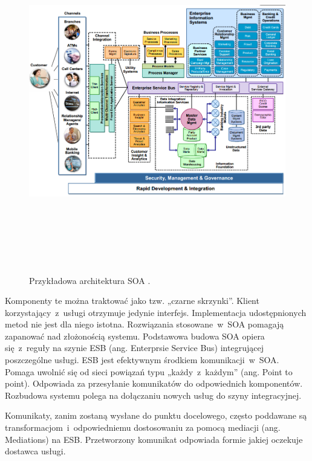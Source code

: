\begin{figure}[h!tbp]
\begin{centering}
\includegraphics[width=16cm, height=15cm]{img/soa_arch.png}
\caption[Przykładowa architektura SOA.]{Przykładowa architektura SOA \cite{EXEntArchSOA}.}\label{PRZArchSOA}
\end{centering}
\end{figure}

Komponenty te można traktować jako tzw. „czarne skrzynki”. Klient korzystający~z~usługi otrzymuje jedynie interfejs. Implementacja udostępnionych metod nie jest dla niego istotna.
Rozwiązania stosowane~w~SOA pomagają zapanować nad złożonością systemu. Podstawowa budowa SOA opiera się~z~reguły na szynie ESB (ang. Enterprsie Service Bus) integrującej poszczególne usługi. ESB jest efektywnym środkiem komunikacji~w~SOA. Pomaga uwolnić się od sieci powiązań typu „każdy~z~każdym” (ang. Point to point). Odpowiada za przesyłanie komunikatów do odpowiednich komponentów. Rozbudowa systemu polega na dołączaniu nowych usług do szyny integracyjnej. 
	
Komunikaty, zanim zostaną wysłane do punktu docelowego, często poddawane są transformacjom~i~odpowiedniemu dostosowaniu za pomocą mediacji (ang. Mediations) na ESB. Przetworzony komunikat odpowiada formie jakiej oczekuje dostawca usługi.
	
